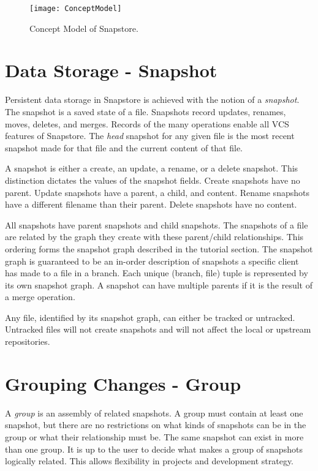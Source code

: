\begin{figure}
\texttt{[image: ConceptModel]}
\caption{Concept Model of Snapstore.}
\label{arm:fig1}
\end{figure}

\section{Data Storage - Snapshot}

Persistent data storage in Snapstore is achieved with the notion of a \textit{snapshot}. The snapshot is a saved state of a file. Snapshots record updates, renames, moves, deletes, and merges. Records of the many operations enable all VCS features of Snapstore. The \textit{head} snapshot for any given file is the most recent snapshot made for that file and the current content of that file. 

A snapshot is either a create, an update, a rename, or a delete snapshot. This distinction dictates the values of the snapshot fields. Create snapshots have no parent. Update snapshots have a parent, a child, and content. Rename snapshots have a different filename than their parent. Delete snapshots have no content.

All snapshots have parent snapshots and child snapshots. The snapshots of a file are related by the graph they create with these parent/child relationships. This ordering forms the snapshot graph described in the tutorial section. The snapshot graph is guaranteed to be an in-order description of snapshots a specific client has made to a file in a branch. Each unique (branch, file) tuple is represented by its own snapshot graph. A snapshot can have multiple parents if it is the result of a merge operation.

Any file, identified by its snapshot graph, can either be tracked or untracked. Untracked files will not create snapshots and will not affect the local or upstream repositories.

\section{Grouping Changes - Group}

A \textit{group} is an assembly of related snapshots. A group must contain at least one snapshot, but there are no restrictions on what kinds of snapshots can be in the group or what their relationship must be. The same snapshot can exist in more than one group. It is up to the user to decide what makes a group of snapshots logically related. This allows flexibility in projects and development strategy.

